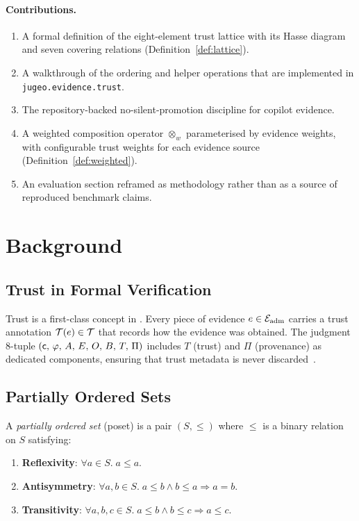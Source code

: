 \documentclass[11pt]{article}
\newcommand{\TAlg}{\mathcal{T}}
\newcommand{\wcomp}{\otimes_w}
\begin{document}
\paragraph{Contributions.}
\begin{enumerate}[leftmargin=2em]
  \item A formal definition of the eight-element trust lattice
        with its Hasse diagram and seven covering relations
        (Definition~\ref{def:lattice}).
  \item A walkthrough of the ordering and helper operations that are
        implemented in \texttt{jugeo.evidence.trust}.
  \item The repository-backed no-silent-promotion discipline for copilot
        evidence.
  \item A weighted composition operator $\wcomp$ parameterised by evidence
        weights, with configurable trust weights for each evidence source
        (Definition~\ref{def:weighted}).
  \item An evaluation section reframed as methodology rather than as a
        source of reproduced benchmark claims.
\end{enumerate}

\section{Background}\label{sec:bg}

\subsection{Trust in Formal Verification}

Trust is a first-class concept in \JuGeo.  Every piece of evidence $e \in
\mathcal{E}_{\mathrm{adm}}$ carries a trust annotation $\trust(e) \in \TAlg$ that records how the
evidence was obtained.  The judgment 8-tuple
$(\mathsf{c},\,\varphi,\,A,\,E,\,O,\,B,\,T,\,\Pi)$ includes $T$ (trust) and $\Pi$
(provenance) as dedicated components, ensuring that trust metadata is never
discarded~\cite{jugeo-paper04}.

\subsection{Partially Ordered Sets}

\begin{definition}\label{def:poset}
A \emph{partially ordered set} (poset) is a pair $(S, \leq)$ where $\leq$ is
a binary relation on $S$ satisfying:
\begin{enumerate}[leftmargin=2em]
  \item \textbf{Reflexivity}: $\forall a \in S.\; a \leq a$.
  \item \textbf{Antisymmetry}: $\forall a, b \in S.\; a \leq b \wedge b \leq a
        \Rightarrow a = b$.
  \item \textbf{Transitivity}: $\forall a, b, c \in S.\; a \leq b \wedge b \leq c
        \Rightarrow a \leq c$.
\end{enumerate}
\end{definition}
\end{document}
